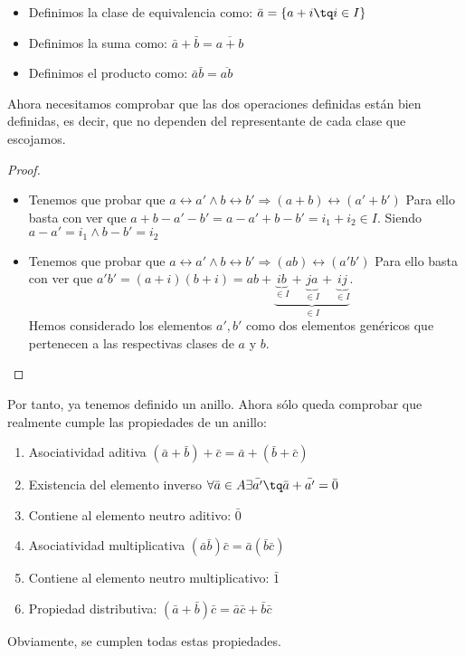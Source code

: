 \documentclass[nochap]{apuntes}
\begin{document}
\begin{itemize}
 \item Definimos la clase de equivalencia como: $\bar{a}=\{a+i \tq i \in I\}$
 \item Definimos la suma como: $\bar{a}+\bar{b}=\overline{a+b}$
 \item Definimos el producto como: $\bar{a}\bar{b}=\overline{ab}$
\end{itemize}
Ahora necesitamos comprobar que las dos operaciones definidas están bien definidas, es decir, que no dependen del representante de cada
clase que escojamos.
\begin{proof}
 \begin{itemize}
  \item Tenemos que probar que $a\rel a' \wedge b\rel b' \Rightarrow (a+b)\rel (a'+b')$
  Para ello basta con ver que $a+b-a'-b'=a-a'+b-b'=i_1+i_2 \in I$. Siendo $a-a'=i_1 \wedge b-b'=i_2$
  \item Tenemos que probar que $a\rel a' \wedge b\rel b' \Rightarrow (ab)\rel (a'b')$
  Para ello basta con ver que $a'b'=(a+i)(b+i)=ab+\underbrace{\underbrace{ib}_{\in I}+\underbrace{ja}_{\in I}+\underbrace{ij}_{\in I}}_{\in I}$.\\
  Hemos considerado los elementos $a', b'$  como dos elementos genéricos que pertenecen a las respectivas clases de $a$ y $b$.
 \end{itemize}
\end{proof}

Por tanto, ya tenemos definido un anillo. Ahora sólo queda comprobar que realmente cumple las propiedades de un anillo:
\begin{enumerate}
 \item Asociatividad aditiva $(\bar{a}+\bar{b})+\bar{c}=\bar{a}+(\bar{b}+\bar{c})$
 \item Existencia del elemento inverso $\forall \bar{a} \in A \exists \bar{a'} \tq \bar{a}+\bar{a'}=\bar{0}$
 \item Contiene al elemento neutro aditivo: $\bar{0}$
 \item Asociatividad multiplicativa $(\bar{a}\bar{b})\bar{c}=\bar{a}(\bar{b}\bar{c})$
 \item Contiene al elemento neutro multiplicativo: $\bar{1}$
 \item Propiedad distributiva: $(\bar{a}+\bar{b})\bar{c}=\bar{a}\bar{c}+\bar{b}\bar{c}$
\end{enumerate}
Obviamente, se cumplen todas estas propiedades.
\end{document}
